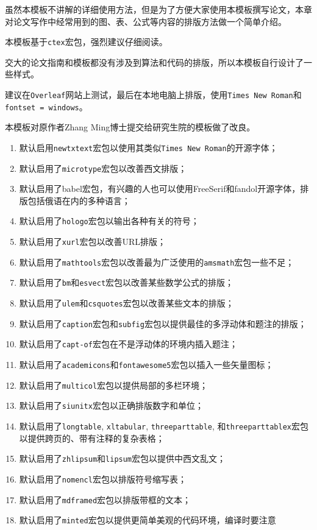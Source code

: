 

虽然本模板不讲解的详细使用方法，但是为了方便大家使用本模板撰写论文，本章对论文写作中经常用到的{\heiti 图、表、公式}等内容的排版方法做一个简单介绍。

\begin{mdframed}
本模板基于\texttt{ctex}宏包，强烈建议仔细阅读。

交大的论文指南和模板都没有涉及到算法和代码的排版，所以本模板自行设计了一些样式。

建议在\texttt{Overleaf}网站上测试，最后在本地电脑上排版，使用\texttt{Times New Roman}和\texttt{fontset = windows}。

本模板对原作者Zhang Ming博士提交给研究生院的模板做了改良。
\begin{enumerate}
  \item 默认启用\texttt{newtxtext}宏包以使用其类似\texttt{Times New Roman}的开源字体；
  \item 默认启用了\texttt{microtype}宏包以改善西文排版；
  \item 默认启用了babel宏包，有兴趣的人也可以使用FreeSerif和fandol开源字体，排版包括俄语在内的多种语言；
  \item 默认启用了\texttt{hologo}宏包以输出各种有关的符号；
  \item 默认启用了\texttt{xurl}宏包以改善URL排版；
  \item 默认启用了\texttt{mathtools}宏包以改善最为广泛使用的\texttt{amsmath}宏包一些不足；
  \item 默认启用了\texttt{bm}和\texttt{esvect}宏包以改善某些数学公式的排版；
  \item 默认启用了\texttt{ulem}和\texttt{csquotes}宏包以改善某些文本的排版；
  \item 默认启用了\texttt{caption}宏包和\texttt{subfig}宏包以提供最佳的多浮动体和题注的排版；
  \item 默认启用了\texttt{capt-of}宏包在不是浮动体的环境内插入题注；
  \item 默认启用了\texttt{academicons}和\texttt{fontawesome5}宏包以插入一些矢量图标；
  \item 默认启用了\texttt{multicol}宏包以提供局部的多栏环境；
  \item 默认启用了\texttt{siunitx}宏包以正确排版数字和单位；
  \item 默认启用了\texttt{longtable}, \texttt{xltabular}, \texttt{threeparttable}, 和\texttt{threeparttablex}宏包以提供跨页的、带有注释的复杂表格；
  \item 默认启用了\texttt{zhlipsum}和\texttt{lipsum}宏包以提供中西文乱文；
  \item 默认启用了\texttt{nomencl}宏包以排版符号缩写表；
  \item 默认启用了\texttt{mdframed}宏包以排版带框的文本；
  \item 默认启用了\texttt{minted}宏包以提供更简单美观的代码环境，编译时要注意 
  

\end{enumerate}
\end{mdframed}
